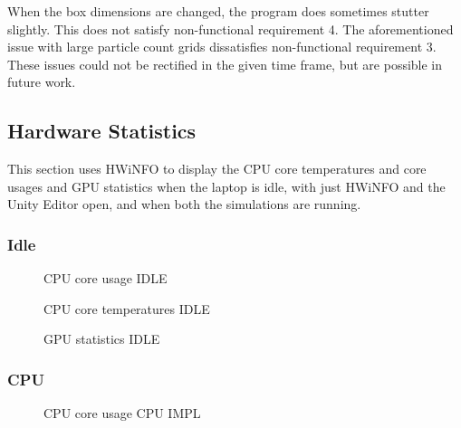 \documentclass[a4paper, 12pt]{article}
\newcommand{\wideimage}[2][]{%
  \makebox[\textwidth][c]{\texttt{[image: \#2]}}%
}
\begin{document}
    When the box dimensions are changed, the program does sometimes stutter slightly. This does not satisfy non-functional requirement 4. The aforementioned issue with large particle count grids dissatisfies non-functional requirement 3. These issues could not be rectified in the given time frame, but are possible in future work.

    \subsection{Hardware Statistics}

    This section uses HWiNFO\cite{hwinfo} to display the CPU core temperatures and core usages and GPU statistics when the laptop is idle, with just HWiNFO and the Unity Editor open, and when both the simulations are running.

    \subsubsection{Idle}

    \begin{figure}[H]
        \begin{center}
            \wideimage[width=1.1\textwidth]{beforeCPUUsage.png}
            \caption{CPU core usage IDLE}
        \end{center}
    \end{figure}

    \begin{figure}[H]
        \begin{center}
            \wideimage[width=0.75\textwidth, height=0.41\textheight]{beforeCPUTemp.png}
            \caption{CPU core temperatures IDLE}
        \end{center}
    \end{figure}

    \begin{figure}[H]
        \begin{center}
            \wideimage[width=0.75\textwidth, height=0.41\textheight]{beforeGPU.png}
            \caption{GPU statistics IDLE}
        \end{center}
    \end{figure}

    \subsubsection{CPU}

    \begin{figure}[H]
        \begin{center}
            \wideimage[width=1.1\textwidth]{afterCPUUsageCPU.png}
            \caption{CPU core usage CPU IMPL}
        \end{center}
    \end{figure}
\end{document}
